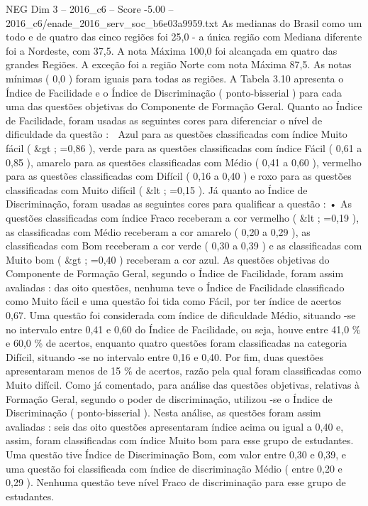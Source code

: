 \begin{textsample}{NEG Dim 3 – 2016\_c6 – Score -5.00 – 2016\_c6/enade\_2016\_serv\_soc\_b6e03a9959.txt}
As medianas do Brasil como um todo e de quatro das cinco regiões foi 25,0 - a única região com Mediana diferente foi a Nordeste, com 37,5.
A nota Máxima 100,0 foi alcançada em quatro das grandes Regiões.
A exceção foi a região Norte com nota Máxima 87,5.
As notas mínimas ( 0,0 ) foram iguais para todas as regiões.
A Tabela 3.10 apresenta o Índice de Facilidade e o Índice de Discriminação ( ponto-bisserial ) para cada uma das questões objetivas do Componente de Formação Geral.
Quanto ao Índice de Facilidade, foram usadas as seguintes cores para diferenciar o nível de dificuldade da questão :  Azul para as questões classificadas com índice Muito fácil ( \&gt ; =0,86 ), verde para as questões classificadas com índice Fácil ( 0,61 a 0,85 ), amarelo para as questões classificadas com Médio ( 0,41 a 0,60 ), vermelho para as questões classificadas com Difícil ( 0,16 a 0,40 ) e roxo para as questões classificadas com Muito difícil ( \&lt ; =0,15 ).
Já quanto ao Índice de Discriminação, foram usadas as seguintes cores para qualificar a questão : • As questões classificadas com índice Fraco receberam a cor vermelho ( \&lt ; =0,19 ), as classificadas com Médio receberam a cor amarelo ( 0,20 a 0,29 ), as classificadas com Bom receberam a cor verde ( 0,30 a 0,39 ) e as classificadas com Muito bom ( \&gt ; =0,40 ) receberam a cor azul.
As questões objetivas do Componente de Formação Geral, segundo o Índice de Facilidade, foram assim avaliadas : das oito questões, nenhuma teve o Índice de Facilidade classificado como Muito fácil e uma questão foi tida como Fácil, por ter índice de acertos 0,67.
Uma questão foi considerada com índice de dificuldade Médio, situando -se no intervalo entre 0,41 e 0,60 do Índice de Facilidade, ou seja, houve entre 41,0 \% e 60,0 \% de acertos, enquanto quatro questões foram classificadas na categoria Difícil, situando -se no intervalo entre 0,16 e 0,40.
Por fim, duas questões apresentaram menos de 15 \% de acertos, razão pela qual foram classificadas como Muito difícil.
Como já comentado, para análise das questões objetivas, relativas à Formação Geral, segundo o poder de discriminação, utilizou -se o Índice de Discriminação ( ponto-bisserial ).
Nesta análise, as questões foram assim avaliadas : seis das oito questões apresentaram índice acima ou igual a 0,40 e, assim, foram classificadas com índice Muito bom para esse grupo de estudantes.
Uma questão tive Índice de Discriminação Bom, com valor entre 0,30 e 0,39, e uma questão foi classificada com índice de discriminação Médio ( entre 0,20 e 0,29 ).
Nenhuma questão teve nível Fraco de discriminação para esse grupo de estudantes.

\end{textsample}
